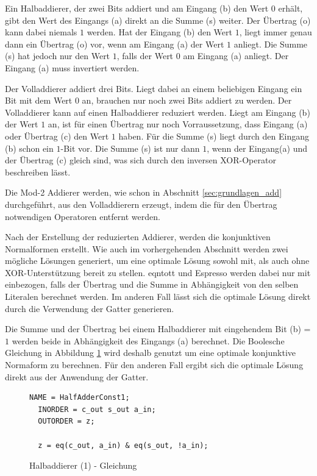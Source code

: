 Ein Halbaddierer, der zwei Bits addiert und am Eingang (b) den Wert $0$ erhält, gibt den Wert des Eingangs (a) direkt an die Summe (s) weiter.
Der Übertrag (o) kann dabei niemals $1$ werden. Hat der Eingang (b) den Wert $1$, liegt immer genau dann ein Übertrag (o) vor, wenn am Eingang (a)
der Wert $1$ anliegt. Die Summe (s) hat jedoch nur den Wert $1$, falls der Wert $0$ am Eingang (a) anliegt. Der Eingang (a) muss invertiert werden.

Der Volladdierer addiert drei Bits. Liegt dabei an einem beliebigen Eingang ein Bit mit dem Wert $0$ an, brauchen nur noch zwei Bits addiert zu werden.
Der Volladdierer kann auf einen Halbaddierer reduziert werden. Liegt am Eingang (b) der Wert $1$ an, ist für einen Übertrag nur noch Vorraussetzung,
dass Eingang (a) oder Übertrag (c) den Wert $1$ haben. Für die Summe (s) liegt durch den Eingang (b) schon ein $1$-Bit vor. Die Summe (s) ist nur dann
$1$, wenn der Eingang(a) und der Übertrag (c) gleich sind, was sich durch den inversen XOR-Operator beschreiben lässt.

Die Mod-2 Addierer werden, wie schon in Abschnitt \ref{sec:grundlagen_add} durchgeführt, aus den Volladdierern erzeugt, indem die für den Übertrag
notwendigen Operatoren entfernt werden.

Nach der Erstellung der reduzierten Addierer, werden die konjunktiven Normalformen erstellt. Wie auch im vorhergehenden Abschnitt werden zwei mögliche
Lösungen generiert, um eine optimale Lösung sowohl mit, als auch ohne XOR-Unterstützung bereit zu stellen. eqntott und Espresso werden dabei nur mit
einbezogen, falls der Übertrag und die Summe in Abhängigkeit von den selben Literalen berechnet werden. Im anderen Fall lässt sich die optimale Lösung
direkt durch die Verwendung der Gatter generieren.

Die Summe und der Übertrag bei einem Halbaddierer mit eingehendem Bit (b) = $1$ werden beide in Abhängigkeit des Eingangs (a) berechnet. Die Boolesche
Gleichung in Abbildung \ref{fig:halfadder1_qen} wird deshalb genutzt um eine optimale konjunktive Normaform zu berechnen. Für den anderen Fall ergibt
sich die optimale Lösung direkt aus der Anwendung der Gatter. \clearpage
\begin{figure}[!h]
  \centering
  \begin{lstlisting}[]
  NAME = HalfAdderConst1;
  INORDER = c_out s_out a_in;
  OUTORDER = z;

  z = eq(c_out, a_in) & eq(s_out, !a_in);
  \end{lstlisting}
  \caption{Halbaddierer (1) - Gleichung}
  \label{fig:halfadder1_qen}
\end{figure}

